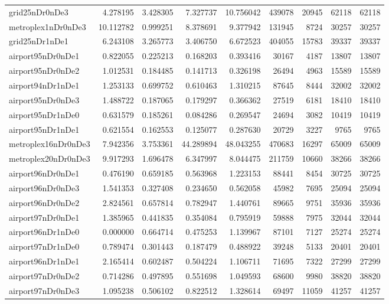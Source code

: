 \begin{longtable}{|l|r|r|r|r|r|r|r|r|}
grid25nDr0nDe3 & 4.278195 & 3.428305 & 7.327737 & 10.756042 & 439078 & 20945 & 62118 & 62118 \\
metroplex1nDr0nDe3 & 10.112782 & 0.999251 & 8.378691 & 9.377942 & 131945 & 8724 & 30257 & 30257 \\
grid25nDr1nDe1 & 6.243108 & 3.265773 & 3.406750 & 6.672523 & 404055 & 15783 & 39337 & 39337 \\
airport95nDr0nDe1 & 0.822055 & 0.225213 & 0.168203 & 0.393416 & 30167 & 4187 & 13807 & 13807 \\
airport95nDr0nDe2 & 1.012531 & 0.184485 & 0.141713 & 0.326198 & 26494 & 4963 & 15589 & 15589 \\
airport94nDr1nDe1 & 1.253133 & 0.699752 & 0.610463 & 1.310215 & 87645 & 8444 & 32002 & 32002 \\
airport95nDr0nDe3 & 1.488722 & 0.187065 & 0.179297 & 0.366362 & 27519 & 6181 & 18410 & 18410 \\
airport95nDr1nDe0 & 0.631579 & 0.185261 & 0.084286 & 0.269547 & 24694 & 3082 & 10419 & 10419 \\
airport95nDr1nDe1 & 0.621554 & 0.162553 & 0.125077 & 0.287630 & 20729 & 3227 & 9765 & 9765 \\
metroplex16nDr0nDe3 & 7.942356 & 3.753361 & 44.289894 & 48.043255 & 470683 & 16297 & 65009 & 65009 \\
metroplex20nDr0nDe3 & 9.917293 & 1.696478 & 6.347997 & 8.044475 & 211759 & 10660 & 38266 & 38266 \\
airport96nDr0nDe1 & 0.476190 & 0.659185 & 0.563968 & 1.223153 & 88441 & 8454 & 30725 & 30725 \\
airport96nDr0nDe3 & 1.541353 & 0.327408 & 0.234650 & 0.562058 & 45982 & 7695 & 25094 & 25094 \\
airport96nDr0nDe2 & 2.824561 & 0.657814 & 0.782947 & 1.440761 & 89665 & 9751 & 35936 & 35936 \\
airport97nDr0nDe1 & 1.385965 & 0.441835 & 0.354084 & 0.795919 & 59888 & 7975 & 32044 & 32044 \\
airport96nDr1nDe0 & 0.000000 & 0.664714 & 0.475253 & 1.139967 & 87101 & 7127 & 25274 & 25274 \\
airport97nDr1nDe0 & 0.789474 & 0.301443 & 0.187479 & 0.488922 & 39248 & 5133 & 20401 & 20401 \\
airport96nDr1nDe1 & 2.165414 & 0.602487 & 0.504224 & 1.106711 & 71695 & 7322 & 27299 & 27299 \\
airport97nDr0nDe2 & 0.714286 & 0.497895 & 0.551698 & 1.049593 & 68600 & 9980 & 38820 & 38820 \\
airport97nDr0nDe3 & 1.095238 & 0.506102 & 0.822512 & 1.328614 & 69497 & 11059 & 41257 & 41257 \\

\end{longtable}
